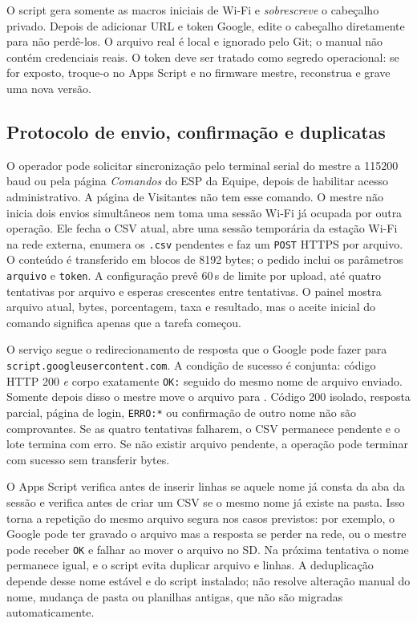 O script  gera somente as macros iniciais de Wi-Fi e \emph{sobrescreve} o cabeçalho privado. Depois de adicionar URL e token Google, edite o cabeçalho diretamente para não perdê-los. O arquivo real é local e ignorado pelo Git; o manual não contém credenciais reais. O token deve ser tratado como segredo operacional: se for exposto, troque-o no Apps Script e no firmware mestre, reconstrua e grave uma nova versão.

\subsection{Protocolo de envio, confirmação e duplicatas}\label{sec:google_fluxo}
O operador pode solicitar sincronização pelo terminal serial do mestre a 115200\,baud ou pela página \emph{Comandos} do ESP da Equipe, depois de habilitar acesso administrativo. A página de Visitantes não tem esse comando. O mestre não inicia dois envios simultâneos nem toma uma sessão Wi-Fi já ocupada por outra operação. Ele fecha o CSV atual, abre uma sessão temporária da estação Wi-Fi na rede externa, enumera os \texttt{.csv} pendentes e faz um \texttt{POST} HTTPS por arquivo. O conteúdo é transferido em blocos de 8192 bytes; o pedido inclui os parâmetros \texttt{arquivo} e \texttt{token}. A configuração prevê 60\,s de limite por upload, até quatro tentativas por arquivo e esperas crescentes entre tentativas. O painel mostra arquivo atual, bytes, porcentagem, taxa e resultado, mas o aceite inicial do comando significa apenas que a tarefa começou.

O serviço segue o redirecionamento de resposta que o Google pode fazer para \texttt{script.googleusercontent.com}. A condição de sucesso é conjunta: código HTTP 200 \emph{e} corpo exatamente \texttt{OK:} seguido do mesmo nome de arquivo enviado. Somente depois disso o mestre move o arquivo para . Código 200 isolado, resposta parcial, página de login, \texttt{ERRO:*} ou confirmação de outro nome não são comprovantes. Se as quatro tentativas falharem, o CSV permanece pendente e o lote termina com erro. Se não existir arquivo pendente, a operação pode terminar com sucesso sem transferir bytes.

O Apps Script verifica antes de inserir linhas se aquele nome já consta da aba da sessão e verifica antes de criar um CSV se o mesmo nome já existe na pasta. Isso torna a repetição do mesmo arquivo segura nos casos previstos: por exemplo, o Google pode ter gravado o arquivo mas a resposta se perder na rede, ou o mestre pode receber \texttt{OK} e falhar ao mover o arquivo no SD. Na próxima tentativa o nome permanece igual, e o script evita duplicar arquivo e linhas. A deduplicação depende desse nome estável e do script instalado; não resolve alteração manual do nome, mudança de pasta ou planilhas antigas, que não são migradas automaticamente.

